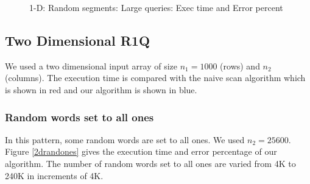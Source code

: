 \documentclass{article}
\begin{document}
\begin{figure}
\mbox{}
\caption{1-D: Random segments: Large queries: Exec time and Error percent} \label{randlarge}
\end{figure}

\subsection{Two Dimensional R1Q}
We used a two dimensional input array of size $n_1 = 1000$ (rows) and $n_2$ (columns). The execution time is compared with the naive scan algorithm which is shown in red and our algorithm is shown in blue.

\subsubsection{Random words set to all ones}
In this pattern, some random words are set to all ones. We used $n_2 = 25600$. Figure \ref{2drandones} gives the execution time and error percentage of our algorithm. The number of random words set to all ones are varied from 4K to 240K in increments of 4K. 
\end{document}

